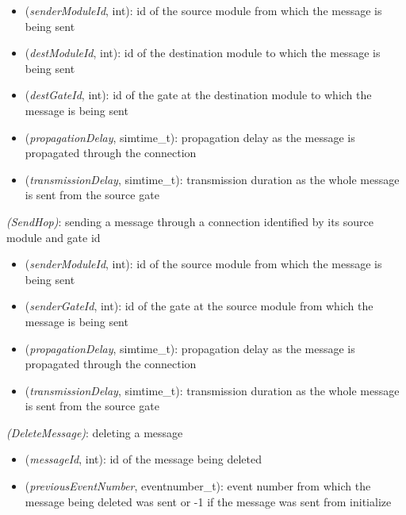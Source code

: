 \begin{itemize}
  \item {} (\textit{senderModuleId}, int): id of the source module from which the message is being sent
  \item {} (\textit{destModuleId}, int): id of the destination module to which the message is being sent
  \item {} (\textit{destGateId}, int): id of the gate at the destination module to which the message is being sent
  \item {} (\textit{propagationDelay}, simtime\_t): propagation delay as the message is propagated through the connection
  \item {} (\textit{transmissionDelay}, simtime\_t): transmission duration as the whole message is sent from the source gate
\end{itemize}

 \textit{(SendHop)}: sending a message through a connection identified by its source module and gate id

\begin{itemize}
  \item {} (\textit{senderModuleId}, int): id of the source module from which the message is being sent
  \item {} (\textit{senderGateId}, int): id of the gate at the source module from which the message is being sent
  \item {} (\textit{propagationDelay}, simtime\_t): propagation delay as the message is propagated through the connection
  \item {} (\textit{transmissionDelay}, simtime\_t): transmission duration as the whole message is sent from the source gate
\end{itemize}

 \textit{(DeleteMessage)}: deleting a message

\begin{itemize}
  \item {} (\textit{messageId}, int): id of the message being deleted
  \item {} (\textit{previousEventNumber}, eventnumber\_t): event number from which the message being deleted was sent or -1 if the message was sent from initialize
\end{itemize}

